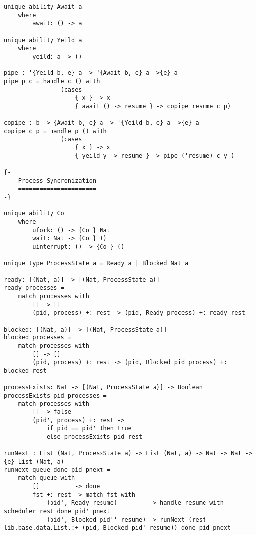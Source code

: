 \documentclass[logo,bsc,singlespacing,parskip]{infthesis}
\begin{document}
\begin{lstlisting}[language=unison]
unique ability Await a
    where
        await: () -> a

unique ability Yeild a
    where
        yeild: a -> ()

pipe : '{Yeild b, e} a -> '{Await b, e} a ->{e} a
pipe p c = handle c () with
                (cases
                    { x } -> x
                    { await () -> resume } -> copipe resume c p)

copipe : b -> {Await b, e} a -> '{Yeild b, e} a ->{e} a
copipe c p = handle p () with
                (cases
                    { x } -> x
                    { yeild y -> resume } -> pipe ('resume) c y )

{-
    Process Syncronization
    ======================
-}

unique ability Co 
    where 
        ufork: () -> {Co } Nat
        wait: Nat -> {Co } ()
        uinterrupt: () -> {Co } ()

unique type ProcessState a = Ready a | Blocked Nat a

ready: [(Nat, a)] -> [(Nat, ProcessState a)]
ready processes =
    match processes with
        [] -> []
        (pid, process) +: rest -> (pid, Ready process) +: ready rest

blocked: [(Nat, a)] -> [(Nat, ProcessState a)]
blocked processes =
    match processes with
        [] -> []
        (pid, process) +: rest -> (pid, Blocked pid process) +: blocked rest

processExists: Nat -> [(Nat, ProcessState a)] -> Boolean
processExists pid processes =
    match processes with
        [] -> false
        (pid', process) +: rest ->
            if pid == pid' then true
            else processExists pid rest

runNext : List (Nat, ProcessState a) -> List (Nat, a) -> Nat -> Nat ->{e} List (Nat, a)
runNext queue done pid pnext = 
    match queue with
        []          -> done
        fst +: rest -> match fst with
            (pid', Ready resume)         -> handle resume with scheduler rest done pid' pnext
            (pid', Blocked pid'' resume) -> runNext (rest lib.base.data.List.:+ (pid, Blocked pid' resume)) done pid pnext 


\end{lstlisting}
\end{document}
